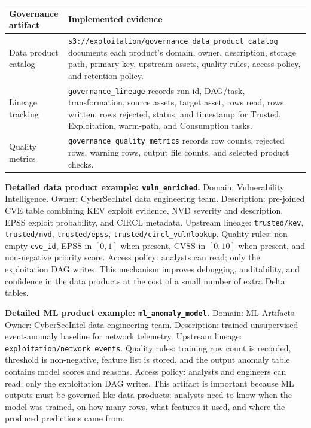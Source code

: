 \documentclass[11pt,a4paper]{article}
\newcommand{\code}[1]{\nolinkurl{#1}}
\newcommand{\hdr}{\rowcolor{csiHead}}
\begin{document}
\begin{tabularx}{\textwidth}{>{\raggedright\arraybackslash}p{3.0cm}X}
\toprule
\hdr
\textbf{Governance artifact} & \textbf{Implemented evidence}\\
\midrule
Data product catalog & \code{s3://exploitation/governance_data_product_catalog} documents each product's domain, owner, description, storage path, primary key, upstream assets, quality rules, access policy, and retention policy.\\
Lineage tracking & \code{governance_lineage} records run id, DAG/task, transformation, source assets, target asset, rows read, rows written, rows rejected, status, and timestamp for Trusted, Exploitation, warm-path, and Consumption tasks.\\
Quality metrics & \code{governance_quality_metrics} records row counts, rejected rows, warning rows, output file counts, and selected product checks.\\
\bottomrule
\end{tabularx}

\textbf{Detailed data product example: \code{vuln_enriched}.} Domain: Vulnerability Intelligence. Owner: CyberSecIntel data engineering team. Description: pre-joined CVE table combining KEV exploit evidence, NVD severity and description, EPSS exploit probability, and CIRCL metadata. Upstream lineage: \code{trusted/kev}, \code{trusted/nvd}, \code{trusted/epss}, \code{trusted/circl_vulnlookup}. Quality rules: non-empty \code{cve_id}, EPSS in $[0,1]$ when present, CVSS in $[0,10]$ when present, and non-negative priority score. Access policy: analysts can read; only the exploitation DAG writes. This mechanism improves debugging, auditability, and confidence in the data products at the cost of a small number of extra Delta tables.

\textbf{Detailed ML product example: \code{ml_anomaly_model}.} Domain: ML Artifacts. Owner: CyberSecIntel data engineering team. Description: trained unsupervised event-anomaly baseline for network telemetry. Upstream lineage: \code{exploitation/network_events}. Quality rules: training row count is recorded, threshold is non-negative, feature list is stored, and the output anomaly table contains model scores and reasons. Access policy: analysts and engineers can read; only the exploitation DAG writes. This artifact is important because ML outputs must be governed like data products: analysts need to know when the model was trained, on how many rows, what features it used, and where the produced predictions came from.
\end{document}
